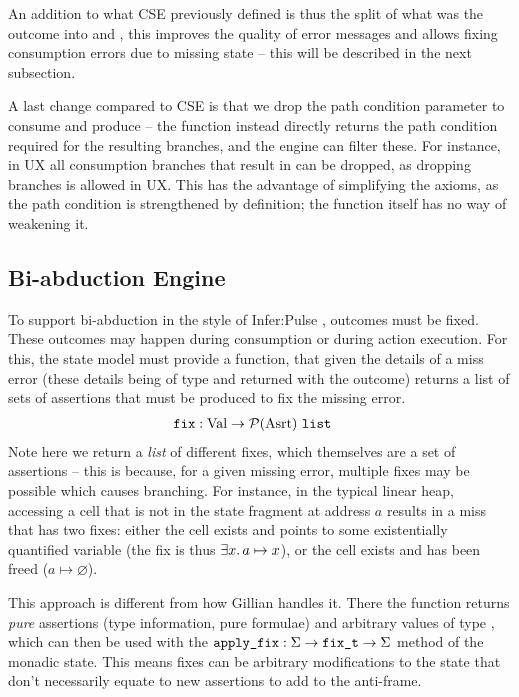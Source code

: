An addition to what CSE previously defined is thus the split of what was the  outcome into \LFail{} and \Miss{}, this improves the quality of error messages and allows fixing consumption errors due to missing state -- this will be described in the next subsection.

A last change compared to CSE is that we drop the path condition parameter to consume and produce -- the function instead directly returns the path condition required for the resulting branches, and the engine can filter these. For instance, in UX all consumption branches that result in \LFail{} can be dropped, as dropping branches is allowed in UX. This has the advantage of simplifying the axioms, as the path condition is strengthened by definition; the function itself has no way of weakening it. 

\subsection{Bi-abduction Engine}

To support bi-abduction in the style of Infer:Pulse \cite{pulse}, \Miss{} outcomes must be fixed. These outcomes may happen during consumption or during action execution. For this, the state model must provide a \fix{} function, that given the details of a miss error (these details being of type \Val{} and returned with the outcome) returns a list of sets of assertions that must be produced to fix the missing error.
\begin{align*}
	\texttt{fix} &: \text{Val} \rightarrow {\cal P}(\text{Asrt}) ~\texttt{list}
\end{align*}
Note here we return a \emph{list} of different fixes, which themselves are a set of assertions -- this is because, for a given missing error, multiple fixes may be possible which causes branching. For instance, in the typical linear heap, accessing a cell that is not in the state fragment at address $a$ results in a miss that has two fixes: either the cell exists and points to some existentially quantified variable (the fix is thus $\exists x\ldotp a \mapsto x$), or the cell exists and has been freed ($a\mapsto\varnothing$).

This approach is different from how Gillian handles it. There the function \fix{} returns \emph{pure} assertions (type information, pure formulae) and arbitrary values of type , which can then be used with the $\texttt{apply\_fix}:\Sigma \rightarrow \texttt{fix\_t} \rightarrow \Sigma$ method of the monadic state. This means fixes can be arbitrary modifications to the state that don't necessarily equate to new assertions to add to the anti-frame.

